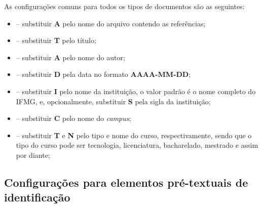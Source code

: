 \documentclass[artigo]{iftex2024}
\begin{document}
As configurações comuns para todos os tipos de documentos são as seguintes:
\begin{itemize}
  \item[]  -- substituir \textbf{A} pelo nome do arquivo contendo as referências;

  \item[]  -- substituir \textbf{T} pelo título;

  \item[]  -- substituir \textbf{A} pelo nome do autor;

  \item[]  -- substituir \textbf{D} pela data no formato \textbf{AAAA-MM-DD};

  \item[]  -- substituir \textbf{I} pelo nome da instituição, o valor padrão é o nome completo do IFMG, e, opcionalmente, substituir \textbf{S} pela sigla da instituição;

  \item[]  -- substituir \textbf{C} pelo nome do  \textit{campus};

  \item[]  -- substituir \textbf{T} e \textbf{N} pelo tipo e nome do curso, respectivamente, sendo que o tipo do curso pode ser tecnologia, licenciatura, bacharelado, mestrado e assim por diante;
\end{itemize}

\subsection{Configurações para elementos pré-textuais de identificação} \label{sec:conf_pretextuais}
\end{document}
